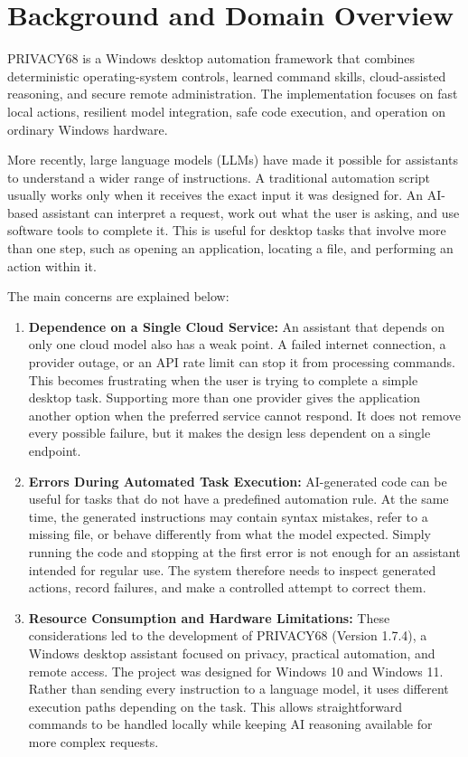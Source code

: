 \documentclass[12pt,letterpaper,oneside]{report}
\begin{document}
\section{Background and Domain Overview}
PRIVACY68 is a Windows desktop automation framework that combines deterministic operating-system controls, learned command skills, cloud-assisted reasoning, and secure remote administration. The implementation focuses on fast local actions, resilient model integration, safe code execution, and operation on ordinary Windows hardware.

More recently, large language models (LLMs) have made it possible for assistants to understand a wider range of instructions. A traditional automation script usually works only when it receives the exact input it was designed for. An AI-based assistant can interpret a request, work out what the user is asking, and use software tools to complete it. This is useful for desktop tasks that involve more than one step, such as opening an application, locating a file, and performing an action within it.

The main concerns are explained below:
\begin{enumerate}
    \item \textbf{Dependence on a Single Cloud Service:} An assistant that depends on only one cloud model also has a weak point. A failed internet connection, a provider outage, or an API rate limit can stop it from processing commands. This becomes frustrating when the user is trying to complete a simple desktop task. Supporting more than one provider gives the application another option when the preferred service cannot respond. It does not remove every possible failure, but it makes the design less dependent on a single endpoint.
    \item \textbf{Errors During Automated Task Execution:} AI-generated code can be useful for tasks that do not have a predefined automation rule. At the same time, the generated instructions may contain syntax mistakes, refer to a missing file, or behave differently from what the model expected. Simply running the code and stopping at the first error is not enough for an assistant intended for regular use. The system therefore needs to inspect generated actions, record failures, and make a controlled attempt to correct them.
    \item \textbf{Resource Consumption and Hardware Limitations:} These considerations led to the development of PRIVACY68 (Version 1.7.4), a Windows desktop assistant focused on privacy, practical automation, and remote access. The project was designed for Windows 10 and Windows 11. Rather than sending every instruction to a language model, it uses different execution paths depending on the task. This allows straightforward commands to be handled locally while keeping AI reasoning available for more complex requests.
\end{enumerate}
\end{document}
